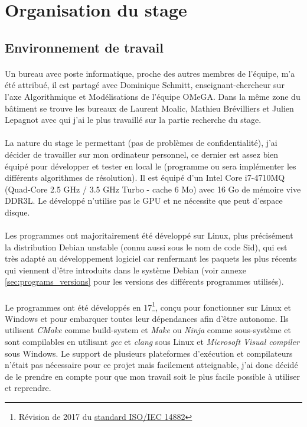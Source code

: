 \documentclass[a4paper,11pt,twoside,french,report]{../common/simplem}
\begin{document}
		\section{Organisation du stage}
			\subsection{Environnement de travail}
				\paragraph*{}
					Un bureau avec poste informatique, proche des autres membres de l'équipe, m'a été attribué, il est partagé avec Dominique Schmitt, enseignant-chercheur sur l'axe Algorithmique et Modélisations de l'équipe \gls{OMeGA}. Dans la même zone du bâtiment se trouve les bureaux de Laurent Moalic, Mathieu Brévilliers et Julien Lepagnot avec qui j'ai le plus travaillé sur la partie recherche du stage.
				\paragraph*{}
					La nature du stage le permettant (pas de problèmes de confidentialité), j'ai décider de travailler sur mon ordinateur personnel, ce dernier est assez bien équipé pour développer et tester en local le \solver{} (programme ou sera implémenter les différents algorithmes de résolution). Il est équipé d'un Intel Core i7-4710MQ (Quad-Core 2.5 GHz / 3.5 GHz Turbo - cache 6 Mo) avec 16 Go de mémoire vive DDR3L. Le \solver{} développé n'utilise pas le GPU et ne nécessite que peut d'espace disque.
				\paragraph*{}
					Les programmes ont majoritairement été développé sur Linux, plus précisément la distribution Debian unstable (connu aussi sous le nom de code Sid), qui est très adapté au développement logiciel car renfermant les paquets les plus récents qui viennent d'être introduits dans le système Debian (voir annexe \ref{sec:programs_versions} pour les versions des différents programmes utilisés).
				\paragraph*{}
					Le programmes ont été développés en \Cpp{}17\footnote{Révision de 2017 du \href{https://www.iso.org/standard/68564.html}{standard ISO/IEC 14882}}, conçu pour fonctionner sur Linux et Windows et pour embarquer toutes leur dépendances afin d'être autonome. Ils utilisent \textit{CMake} comme build-system et \textit{Make} ou \textit{Ninja} comme sous-système et sont compilables en utilisant \textit{gcc} et \textit{clang} sous Linux et \textit{Microsoft Visual \Cpp{} compiler} sous Windows. Le support de plusieurs plateformes d'exécution et compilateurs n'était pas nécessaire pour ce projet mais facilement atteignable, j'ai donc décidé de le prendre en compte pour que mon travail soit le plus facile possible à utiliser et reprendre.
\end{document}

